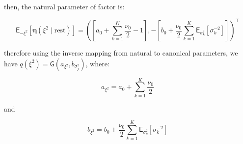 \begin{appendix}
\begin{itemize}
then, the natural parameter of factor is:

\begin{equation}
\mathsf{E}_{-\xi^2}\left[\bm{\eta}(\xi^2\mid \text{rest})\right]=\left(\left[ a_0 +\sum_{k=1}^{K}\frac{\nu_0}{2} -1\right],-\left[ b_0 + \frac{\nu_0}{2} \sum_{k=1}^{K} \mathsf{E}_{\sigma^2_k}\left[\sigma_k^{-2}\right]\right]\right)^\top
\end{equation}

therefore using the inverse mapping from natural to canonical parameters, we have $q(\xi^2)=\mathsf{G}(a_{\xi^2},b_{\sigma_j^2})$, where:

\begin{equation}
a_{\xi^2}=  a_0 +\sum_{k=1}^{K}\frac{\nu_0}{2}
\end{equation}

and

\begin{equation}
b_{\xi^2}= b_0 + \frac{\nu_0}{2} \sum_{k=1}^{K} \mathsf{E}_{\sigma^2_k}\left[\sigma_k^{-2}\right]
\end{equation}


\end{itemize}
\end{appendix}
